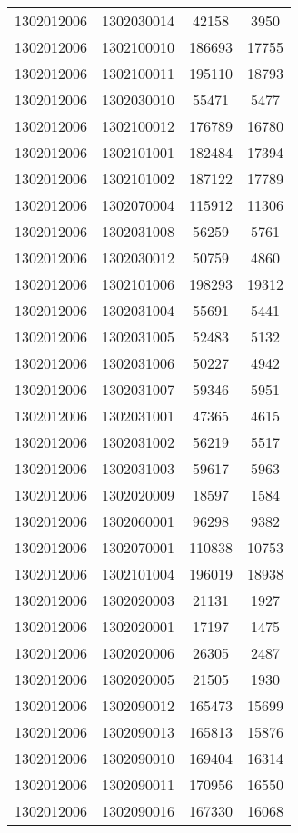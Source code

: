 \begin{longtable}[h]{llcc}
		1302012006 & 1302030014 & 42158 & 3950\\
		1302012006 & 1302100010 & 186693 & 17755\\
		1302012006 & 1302100011 & 195110 & 18793\\
		1302012006 & 1302030010 & 55471 & 5477\\
		1302012006 & 1302100012 & 176789 & 16780\\
		1302012006 & 1302101001 & 182484 & 17394\\
		1302012006 & 1302101002 & 187122 & 17789\\
		1302012006 & 1302070004 & 115912 & 11306\\
		1302012006 & 1302031008 & 56259 & 5761\\
		1302012006 & 1302030012 & 50759 & 4860\\
		1302012006 & 1302101006 & 198293 & 19312\\
		1302012006 & 1302031004 & 55691 & 5441\\
		1302012006 & 1302031005 & 52483 & 5132\\
		1302012006 & 1302031006 & 50227 & 4942\\
		1302012006 & 1302031007 & 59346 & 5951\\
		1302012006 & 1302031001 & 47365 & 4615\\
		1302012006 & 1302031002 & 56219 & 5517\\
		1302012006 & 1302031003 & 59617 & 5963\\
		1302012006 & 1302020009 & 18597 & 1584\\
		1302012006 & 1302060001 & 96298 & 9382\\
		1302012006 & 1302070001 & 110838 & 10753\\
		1302012006 & 1302101004 & 196019 & 18938\\
		1302012006 & 1302020003 & 21131 & 1927\\
		1302012006 & 1302020001 & 17197 & 1475\\
		1302012006 & 1302020006 & 26305 & 2487\\
		1302012006 & 1302020005 & 21505 & 1930\\
		1302012006 & 1302090012 & 165473 & 15699\\
		1302012006 & 1302090013 & 165813 & 15876\\
		1302012006 & 1302090010 & 169404 & 16314\\
		1302012006 & 1302090011 & 170956 & 16550\\
		1302012006 & 1302090016 & 167330 & 16068\\

\end{longtable}
